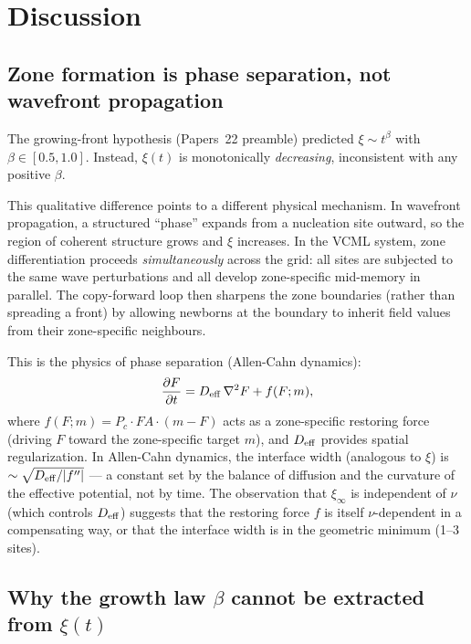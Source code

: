 \documentclass[11pt]{article}
\begin{document}
\section{Discussion}

\subsection{Zone formation is phase separation, not wavefront propagation}

The growing-front hypothesis (Papers~22 preamble) predicted $\xi \sim t^\beta$ with
$\beta \in [0.5, 1.0]$.
Instead, $\xi(t)$ is monotonically \emph{decreasing}, inconsistent with any positive $\beta$.

This qualitative difference points to a different physical mechanism.
In wavefront propagation, a structured ``phase'' expands from a nucleation site
outward, so the region of coherent structure grows and $\xi$ increases.
In the VCML system, zone differentiation proceeds \emph{simultaneously} across the grid:
all sites are subjected to the same wave perturbations and all develop zone-specific
mid-memory in parallel.
The copy-forward loop then sharpens the zone boundaries (rather than spreading a front)
by allowing newborns at the boundary to inherit field values from their zone-specific neighbours.

This is the physics of phase separation (Allen-Cahn dynamics):
\begin{equation}
  \frac{\partial F}{\partial t} = D_{\rm eff}\,\nabla^2 F + f(F; m),
\end{equation}
where $f(F; m) = P_c \cdot FA \cdot (m - F)$ acts as a zone-specific restoring force
(driving $F$ toward the zone-specific target $m$), and $D_{\rm eff}$ provides spatial
regularization.
In Allen-Cahn dynamics, the interface width (analogous to $\xi$) is
$\sim \sqrt{D_{\rm eff} / |f''|}$ --- a constant set by the balance of diffusion and
the curvature of the effective potential, not by time.
The observation that $\xi_\infty$ is independent of $\nu$ (which controls $D_{\rm eff}$)
suggests that the restoring force $f$ is itself $\nu$-dependent in a compensating way,
or that the interface width is in the geometric minimum (1--3 sites).

\subsection{Why the growth law $\beta$ cannot be extracted from $\xi(t)$}
\end{document}
